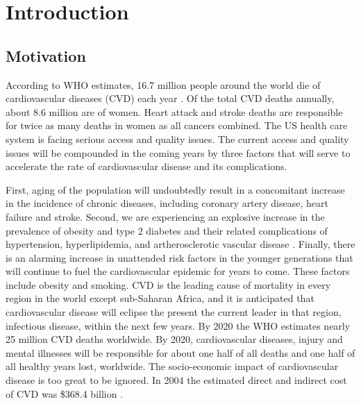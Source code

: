 \chapter{Introduction}
\label{intro}
 
\section{Motivation} 
According to WHO estimates, 16.7 million people around the world die of cardiovascular diseases (CVD) each year \cite{aha}. Of the total CVD deaths annually, about 8.6 million are of women. Heart attack and stroke deaths are responsible for twice as many deaths in women as all cancers combined. The US health care system is facing serious access and quality issues. The current access and quality issues will be compounded in the coming years by three factors that will serve to accelerate the rate of cardiovascular disease and its complications. 

First, aging of the population will undoubtedly result in a concomitant increase in the incidence of chronic diseases, including coronary artery disease, heart failure and stroke. Second, we are experiencing an explosive increase in the prevalence of obesity and type 2 diabetes and their related complications of hypertension, hyperlipidemia, and artherosclerotic vascular disease \cite{aha}. Finally, there is an alarming increase in unattended risk factors in the younger generations that will continue to fuel the cardiovascular epidemic for years to come. These factors include obesity and smoking. CVD is the leading cause of mortality in every region in the world except sub-Saharan Africa, and it is anticipated that cardiovascular disease will eclipse the present the current leader in that region, infectious disease, within the next few years. By 2020 the WHO estimates nearly 25 million CVD deaths worldwide. By 2020, cardiovascular diseases, injury and mental illnesses will be responsible for about one half of all deaths  and one half of all healthy years lost, worldwide. The socio-economic impact of cardiovascular disease is too great to be ignored. In 2004 the estimated direct and indirect cost of CVD was \$368.4 billion \cite{aha}.

